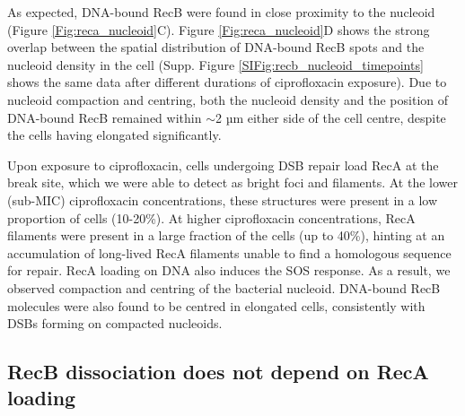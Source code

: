 As expected, DNA-bound RecB were found in close proximity to the nucleoid (Figure \ref{Fig:reca_nucleoid}C). Figure \ref{Fig:reca_nucleoid}D shows the strong overlap between the spatial distribution of DNA-bound RecB spots and the nucleoid density in the cell (Supp. Figure \ref{SIFig:recb_nucleoid_timepoints} shows the same data after different durations of ciprofloxacin exposure). Due to nucleoid compaction and centring, both the nucleoid density and the position of DNA-bound RecB remained within $\sim$2 µm either side of the cell centre, despite the cells having elongated significantly.

Upon exposure to ciprofloxacin, cells undergoing DSB repair load RecA at the break site, which we were able to detect as bright foci and filaments. At the lower (sub-MIC) ciprofloxacin concentrations, these structures were present in a low proportion of cells (10-20\%). At higher ciprofloxacin concentrations, RecA filaments were present in a large fraction of the cells (up to 40\%), hinting at an accumulation of long-lived RecA filaments unable to find a homologous sequence for repair. RecA loading on DNA also induces the SOS response. As a result, we observed compaction and centring of the bacterial nucleoid. DNA-bound RecB molecules were also found to be centred in elongated cells, consistently with DSBs forming on compacted nucleoids.

\subsection*{RecB dissociation does not depend on RecA loading}

